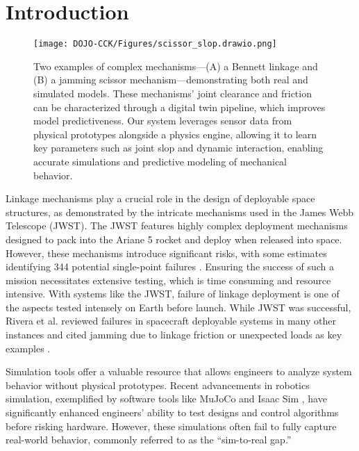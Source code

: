 \section{Introduction} \label{intro}
\begin{figure}
    \texttt{[image: DOJO-CCK/Figures/scissor\_slop.drawio.png]}
    \caption{Two examples of complex mechanisms—(A) a Bennett linkage and (B) a jamming scissor mechanism—demonstrating both real and simulated models. These mechanisms' joint clearance and friction can be characterized through a digital twin pipeline, which improves model predictiveness. Our system leverages sensor data from physical prototypes alongside a physics engine, allowing it to learn key parameters such as joint slop and dynamic interaction, enabling accurate simulations and predictive modeling of mechanical behavior.}
    \label{fig:Hero-Figure}
\end{figure}
Linkage mechanisms play a crucial role in the design of deployable space structures, as demonstrated by the intricate mechanisms used in the James Webb Telescope (JWST). The JWST features highly complex deployment mechanisms designed to pack into the Ariane 5 rocket and deploy when released into space. However, these mechanisms introduce significant risks, with some estimates identifying 344 potential single-point failures \cite{menzel_lessons_2024}. Ensuring the success of such a mission necessitates extensive testing, which is time consuming and resource intensive. With systems like the JWST, failure of linkage deployment is one of the aspects tested intensely on Earth before launch. While JWST was successful, Rivera et al. reviewed failures in spacecraft deployable systems in many other instances and cited jamming due to linkage friction or unexpected loads as key examples \cite{rivera_study_2021}. 

Simulation tools offer a valuable resource that allows engineers to analyze system behavior without physical prototypes. Recent advancements in robotics simulation, exemplified by software tools like MuJoCo \cite{todorov_mujoco_2012} and Isaac Sim \cite{mittal_orbit_2023}, have significantly enhanced engineers’ ability to test designs and control algorithms before risking hardware. However, these simulations often fail to fully capture real-world behavior, commonly referred to as the ``sim-to-real gap.''

